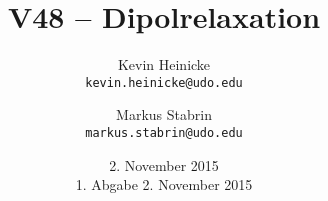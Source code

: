 



\title{%
    V48 -- Dipolrelaxation
}
\author{%
    Kevin Heinicke\\
    \texttt{kevin.heinicke@udo.edu}
    \and
    Markus Stabrin\\
    \texttt{markus.stabrin@udo.edu}
}
\date{%
    2. November 2015\\
    {\small 1. Abgabe} 2. November 2015\\
}

    \maketitle%
    \tableofcontents
    \newpage
    
    

    \printbibliography

